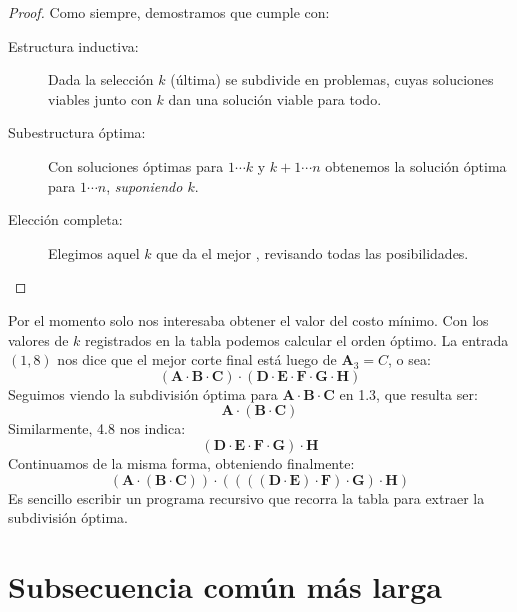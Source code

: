   \begin{proof}
    Como siempre,
    demostramos que cumple con:
    \begin{description}
    \item[Estructura inductiva:]
      Dada la selección \(k\) (última) se subdivide en problemas,
      cuyas soluciones viables junto con \(k\)
      dan una solución viable para todo.
    \item[Subestructura óptima:]
      Con soluciones óptimas
      para \(1 \cdots k\) y \(k + 1 \cdots n\)
      obtenemos la solución óptima para \(1 \cdots n\),
      \emph{suponiendo \(k\)}.
    \item[Elección completa:]
      Elegimos aquel \(k\) que da el mejor ,
      revisando todas las posibilidades.
    \end{description}
  \end{proof}
  Por el momento solo nos interesaba obtener el valor del costo mínimo.
  Con los valores de \(k\) registrados en la tabla
  podemos calcular el orden óptimo.
  La entrada \((1, 8)\) nos dice que el mejor corte final
  está luego de \(\mathbf{A}_3 = C\),
  o sea:
  \begin{equation*}
    (\mathbf{A} \cdot \mathbf{B} \cdot \mathbf{C})
      \cdot (\mathbf{D} \cdot \mathbf{E}
		\cdot \mathbf{F} \cdot \mathbf{G} \cdot \mathbf{H})
  \end{equation*}
  Seguimos viendo la subdivisión óptima
  para \(\mathbf{A} \cdot \mathbf{B} \cdot \mathbf{C}\) en \num{1, 3},
  que resulta ser:
  \begin{equation*}
    \mathbf{A} \cdot (\mathbf{B} \cdot \mathbf{C})
  \end{equation*}
  Similarmente,
  \num{4, 8} nos indica:
  \begin{equation*}
    (\mathbf{D} \cdot \mathbf{E}
		\cdot \mathbf{F} \cdot \mathbf{G}) \cdot \mathbf{H}
  \end{equation*}
  Continuamos de la misma forma,
  obteniendo finalmente:
  \begin{equation*}
    (\mathbf{A} \cdot (\mathbf{B} \cdot \mathbf{C}))
       \cdot ((((\mathbf{D} \cdot \mathbf{E}) \cdot \mathbf{F})
		   \cdot \mathbf{G}) \cdot \mathbf{H})
  \end{equation*}
  Es sencillo escribir un programa recursivo que recorra la tabla
  para extraer la subdivisión óptima.

\section{Subsecuencia común más larga}
\label{sec:LCS}

